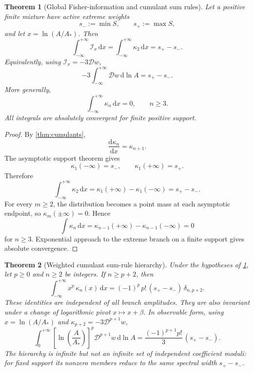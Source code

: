 \documentclass[aps,prd,preprint,onecolumn,nofootinbib,superscriptaddress,showkeys]{revtex4-2}
\numberwithin{equation}{section}
\theoremstyle{definition}
\theoremstyle{plain}
\newtheorem{theorem}{Theorem}[section]
\newcommand{\dd}{\mathrm d}
\newcommand{\Dil}{\mathscr D}
\begin{document}
\begin{theorem}[Global Fisher-information and cumulant sum rules]\label{thm:fisher-sumrule}
Let a positive finite mixture have active extreme weights
\[
s_-:=\min S,\qquad s_+:=\max S,
\]
and let $x=\ln(A/A_*)$.  Then
\begin{equation}
\boxed{
\int_{-\infty}^{+\infty}\mathcal I_x\,\dd x
=
\int_{-\infty}^{+\infty}\kappa_2\,\dd x
=
s_+-s_-.
}
\end{equation}
Equivalently, using $\mathcal I_x=-3\Dil w$,
\begin{equation}
\boxed{
-3\int_{-\infty}^{+\infty}\Dil w\,\dd\ln A
=
s_+-s_-.
}
\end{equation}
More generally,
\begin{equation}
\boxed{
\int_{-\infty}^{+\infty}\kappa_n\,\dd x=0,
\qquad n\ge3.
}
\end{equation}
All integrals are absolutely convergent for finite positive support.
\end{theorem}

\begin{proof}
By \cref{thm:cumulants},
\[
\frac{\dd\kappa_n}{\dd x}=\kappa_{n+1}.
\]
The asymptotic support theorem gives
\[
\kappa_1(-\infty)=s_-,
\qquad
\kappa_1(+\infty)=s_+.
\]
Therefore
\[
\int_{-\infty}^{+\infty}\kappa_2\,\dd x
=
\kappa_1(+\infty)-\kappa_1(-\infty)
=
s_+-s_-.
\]
For every $m\ge2$, the distribution becomes a point mass at each asymptotic endpoint, so $\kappa_m(\pm\infty)=0$.  Hence
\[
\int\kappa_n\,\dd x
=
\kappa_{n-1}(+\infty)-\kappa_{n-1}(-\infty)=0
\]
for $n\ge3$.  Exponential approach to the extreme branch on a finite support gives absolute convergence.
\end{proof}

\begin{theorem}[Weighted cumulant sum-rule hierarchy]\label{thm:weighted-sumrule}
Under the hypotheses of \cref{thm:fisher-sumrule}, let \(p\ge0\) and \(n\ge2\) be integers.  If \(n\ge p+2\), then
\begin{equation}
\boxed{
\int_{-\infty}^{+\infty}x^p\,\kappa_n(x)\,\dd x
=
(-1)^p\,p!\,(s_+-s_-)\,\delta_{n,p+2}.
}
\end{equation}
These identities are independent of all branch amplitudes.  They are also invariant under a change of logarithmic pivot \(x\mapsto x+\beta\).  In observable form, using \(x=\ln(A/A_*)\) and \(\kappa_{p+2}=-3\Dil^{p+1}w\),
\begin{equation}
\boxed{
\int_{0}^{+\infty}
\left[\ln\!\left(\frac{A}{A_*}\right)\right]^p
\Dil^{p+1}w\,\dd\ln A
=
\frac{(-1)^{p+1}p!}{3}\,(s_+-s_-).
}
\end{equation}
The hierarchy is infinite but not an infinite set of independent coefficient moduli: for fixed support its nonzero members reduce to the same spectral width \(s_+-s_-\).
\end{theorem}
\end{document}
